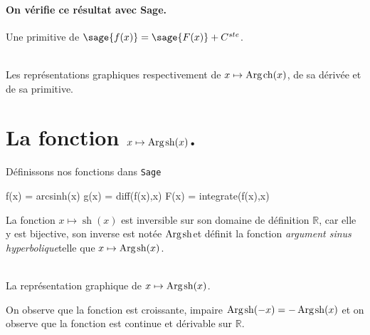 \documentclass[a4paper,12pt]{report}
\def\eclaire{\mathbb}
\def\R{\ensuremath{\eclaire R}}
\renewcommand{\sinh}{\mathop{\mathrm{sh}}}
\renewcommand{\cosh}{\mathop{\mathrm{ch}}}
\renewcommand{\arg}{\mathop{\mathrm{Arg}}}
\begin{document}
\paragraph{On vérifie ce résultat avec Sage.}
Une primitive de $\sage{f(x)} = \sage{F(x)} + C^{ste} $.

\begin{center}
\\
Les représentations graphiques respectivement de $x \mapsto \arg\mspace{-1mu}\cosh(x)$, de sa dérivée et de sa primitive.
\end{center}



\section{La fonction  $x \mapsto \arg\mspace{-1mu}\sinh(x)$.}
Définissons nos fonctions dans {\texttt{Sage}}
\begin{sageblock}
    f(x) = arcsinh(x)
    g(x) = diff(f(x),x)
    F(x) = integrate(f(x),x)
\end{sageblock}


La fonction $x \mapsto \sinh(x)$ est inversible sur son domaine de définition $\R$, car elle y est bijective, son inverse est notée \og$ \arg\mspace{-1mu}\sinh $\fg et définit la fonction \og\emph{argument sinus hyperbolique}\fg telle que $x \mapsto \arg\mspace{-1mu}\sinh(x)$.


\begin{center}
 \\
La représentation graphique de $x \mapsto \arg\mspace{-1mu}\sinh(x)$.
\end{center}
On observe que la fonction est croissante, impaire $\arg\mspace{-1mu}\sinh(-x) = -\arg\mspace{-1mu}\sinh(x) $
et on observe que la fonction est continue et dérivable sur $\R$.                                                                                                             
\end{document}
